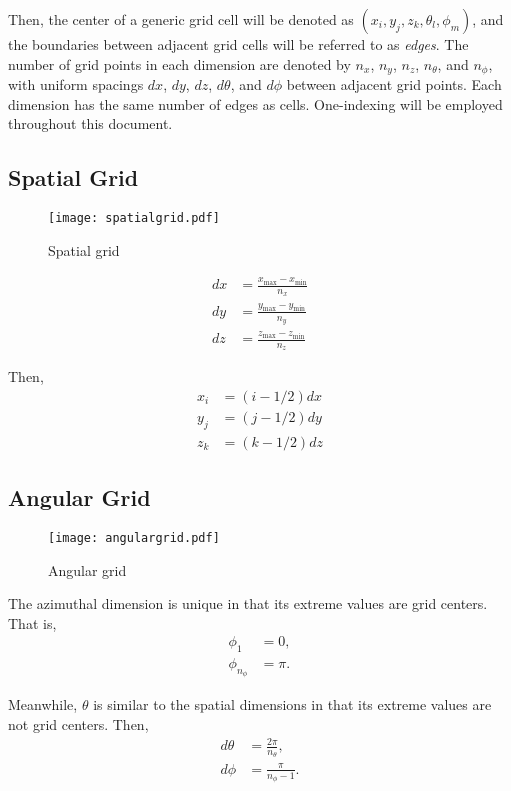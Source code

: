 Then, the center of a generic grid cell will be denoted as
$(x_i,y_j,z_k,\theta_l,\phi_m)$, and the boundaries between adjacent grid cells
will be referred to as \textit{edges}.
The number of grid points in each dimension are denoted by $n_x$, $n_y$, $n_z$,
$n_\theta$, and $n_\phi$, with uniform spacings $dx$, $dy$, $dz$, $d\theta$, and
$d\phi$ between adjacent grid points.
Each dimension has the same number of edges as cells.
One-indexing will be employed throughout this document.
\subsection{Spatial Grid}
\begin{figure}[H]
  \centering
  \texttt{[image: spatialgrid.pdf]}
  \caption{Spatial grid}
  \label{fig:spatial_grid}
\end{figure}

\begin{align}
  dx &= \frac{x_{\max}-x_{\min}}{n_x} \\ 
  dy &= \frac{y_{\max}-y_{\min}}{n_y} \\ 
  dz &= \frac{z_{\max}-z_{\min}}{n_z}
\end{align}

Then,
\begin{align}
  x_i &= (i-1/2)dx \\
  y_j &= (j-1/2)dy \\
  z_k &= (k-1/2)dz
\end{align}

\subsection{Angular Grid}
\begin{figure}[H]
  \centering
  \texttt{[image: angulargrid.pdf]}
  \caption{Angular grid}
  \label{fig:angular_grid}
\end{figure}

The azimuthal dimension is unique in that its extreme values are grid centers.
That is,
\begin{align}
  \phi_1 &= 0, \\
  \phi_{n_\phi} &= \pi.
\end{align}

Meanwhile, $\theta$ is similar to the spatial dimensions in that its extreme
values are not grid centers.
Then,
\begin{align}
  d\theta &= \frac{2\pi}{n_\theta}, \\
  d\phi &= \frac{\pi}{n_\phi-1}.
\end{align}

